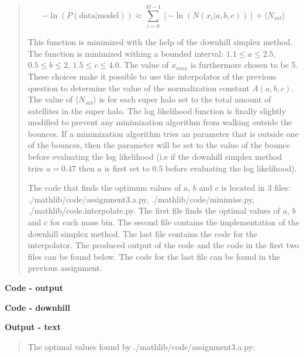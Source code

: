 \begin{quote}
\begin{equation}
- \ln(P(\text{data}|\text{model})) \approx \sum_{i=0}^{M-1} \left[- \ln(N(x_i | a, b, c)) \right] +\langle N_{sat} \rangle
\end{equation}


This function is minimized with the help of the downhill simplex method. The function is minimized withing a bounded interval: $1.1 \leq a \leq 2.5$, $0.5 \leq b \leq 2$, $1.5 \leq c \leq 4.0$. The value of $x_{max}$ is furthermore chosen to be 5. These choices make it possible to use the interpolator of the previous question to determine the value of the normalization constant $A(a, b, c)$. The value of $\langle N_{sat} \rangle$ is for each super halo set to the total amount of satellites in the super halo. The log likelihood function is finally slightly modified to prevent any minimization algorithm from walking outside the bounces. If a minimization algorithm tries an parameter that is outside one of the bounces, then the parameter will be set to the value of the bounce before evaluating the log likelihood (i.e if the downhill simplex method  tries $a = 0.47$ then $a$ is first set to 0.5 before evaluating the log likelihood).



The code that finds the optimum values of $a$, $b$ and $c$ is located in 3 files:
\textsf{./mathlib/code/assignment3.a.py},  \textsf{./mathlib/code/minimise.py}, \textsf{./mathlib/code.interpolate.py}. The first file finds the optimal values of $a$, $b$ and $c$ for each mass bin. The second file contains the implementation of the downhill simplex method. The last file contains the code for the interpolator. The produced output of the code and the code in the first two files can be found below. The code for the last file can be found in the previous assignment. 

\end{quote}


\textbf{Code - output}
\begin{quote}

\end{quote}

\textbf{Code - downhill}
\begin{quote}

\end{quote}

\textbf{Output - text}
\begin{quote}
The optimal values found by \textsf{./mathlib/code/assignment3.a.py}:

\end{quote}

